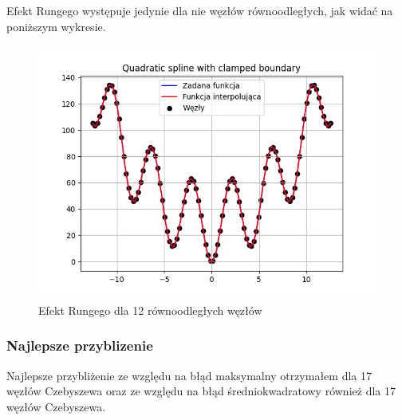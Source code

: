 \documentclass{article}
\begin{document}
Efekt Rungego występuje jedynie dla nie węzłów równoodległych, jak widać na poniższym wykresie.

\begin{figure}[H]
\centering
  \begin{minipage}[b]{0.49\textwidth}
    \includegraphics[width=\textwidth]{img21.png}
    \caption{Efekt Rungego dla 12 równoodległych węzłów}
  \end{minipage}
\end{figure}

\subsubsection{Najlepsze przyblizenie}

Najlepsze przybliżenie ze względu na błąd maksymalny otrzymałem dla 17 węzłów Czebyszewa oraz ze względu na błąd średniokwadratowy również dla 17 węzłów Czebyszewa.
\end{document}
